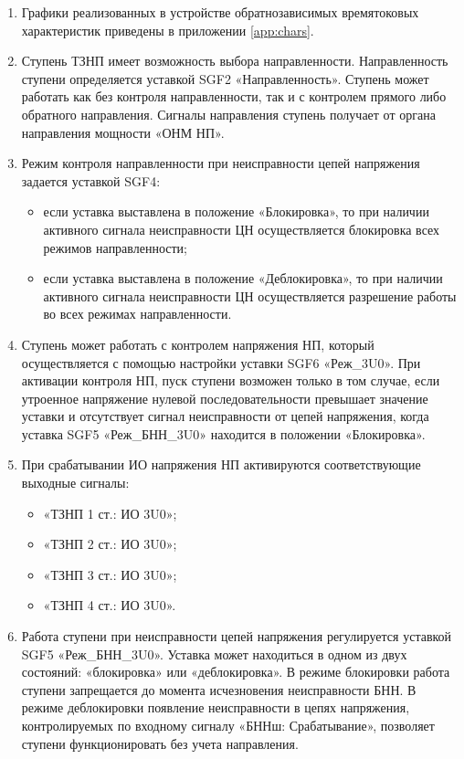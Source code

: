\begin{enumerate}
\begin{enumerate}
\item
Графики реализованных в устройстве обратнозависимых времятоковых характеристик приведены в приложении \ref{app:chars}.

\item
Ступень ТЗНП имеет возможность выбора направленности. Направленность ступени определяется уставкой SGF2 «Направленность».  Ступень может работать как без контроля направленности, так и с контролем прямого либо обратного направления. Сигналы направления ступень получает от органа направления мощности «ОНМ НП».

\item
Режим контроля направленности при неисправности цепей напряжения задается уставкой SGF4:
\begin{itemize}
    \item если уставка выставлена в положение «Блокировка», то при наличии активного сигнала неисправности ЦН осуществляется блокировка всех режимов направленности; 
    \item если уставка выставлена в положение «Деблокировка», то при наличии активного сигнала неисправности ЦН осуществляется разрешение работы во всех режимах направленности. 
\end{itemize}

\item
Ступень может работать с контролем напряжения НП, который осуществляется с помощью настройки уставки SGF6 «Реж\_3U0». При активации контроля НП, пуск ступени возможен только в том случае, если утроенное напряжение нулевой последовательности превышает значение уставки и отсутствует сигнал неисправности от цепей напряжения, когда уставка SGF5 «Реж\_БНН\_3U0» находится в положении «Блокировка».

\item
При срабатывании ИО напряжения НП активируются соответствующие выходные сигналы:
\begin{itemize}
    \item «ТЗНП 1 ст.: ИО 3U0»;
    \item «ТЗНП 2 ст.: ИО 3U0»;
    \item «ТЗНП 3 ст.: ИО 3U0»;
    \item «ТЗНП 4 ст.: ИО 3U0».
\end{itemize}

\item\sloppy
Работа ступени при неисправности цепей напряжения регулируется уставкой SGF5 «Реж\_БНН\_3U0». Уставка может находиться в одном из двух состояний: «блокировка» или «деблокировка». В режиме блокировки работа ступени запрещается до момента исчезновения неисправности БНН. В режиме деблокировки появление неисправности в цепях напряжения, контролируемых по входному сигналу «БННш: Срабатывание», позволяет ступени функционировать без учета направления.


\end{enumerate}
\end{enumerate}
